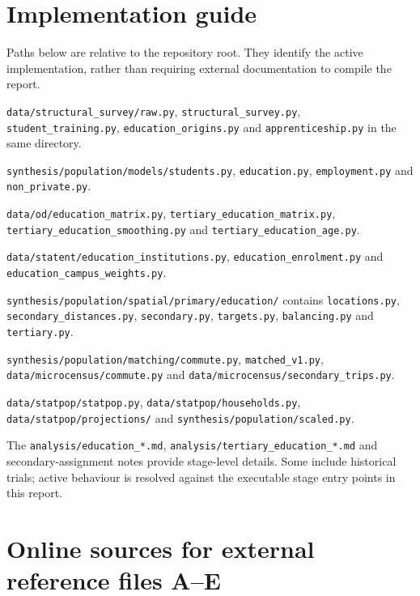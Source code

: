 \documentclass[11pt,a4paper]{article}
\newcommand{\code}[1]{\nolinkurl{#1}}
\begin{document}
\section{Implementation guide}
Paths below are relative to the repository root. They identify the active
implementation, rather than requiring external documentation to compile the report.
\begin{description}
\raggedright
\item[Survey preparation] \code{data/structural_survey/raw.py},
\code{structural_survey.py}, \code{student_training.py},
\code{education_origins.py} and \code{apprenticeship.py} in the same directory.
\item[Population models] \code{synthesis/population/models/students.py},
\code{education.py}, \code{employment.py} and \code{non_private.py}.
\item[OD evidence] \code{data/od/education_matrix.py},
\code{tertiary_education_matrix.py}, \code{tertiary_education_smoothing.py}
and \code{tertiary_education_age.py}.
\item[Institutions and references] \code{data/statent/education_institutions.py},
\code{education_enrolment.py} and \code{education_campus_weights.py}.
\item[Location assignment] \code{synthesis/population/spatial/primary/education/}
contains \code{locations.py}, \code{secondary_distances.py},
\code{secondary.py}, \code{targets.py}, \code{balancing.py} and \code{tertiary.py}.
\item[Matching and diary purposes] \code{synthesis/population/matching/commute.py},
\code{matched_v1.py}, \code{data/microcensus/commute.py} and
\code{data/microcensus/secondary_trips.py}.
\item[Recovery and projections] \code{data/statpop/statpop.py},
\code{data/statpop/households.py}, \code{data/statpop/projections/} and
\code{synthesis/population/scaled.py}.
\item[Companion documentation] The \code{analysis/education_*.md},
\code{analysis/tertiary_education_*.md} and secondary-assignment notes provide
stage-level details. Some include historical trials; active behaviour is
resolved against the executable stage entry points in this report.
\end{description}

\section{Online sources for external reference files A--E}
\end{document}
